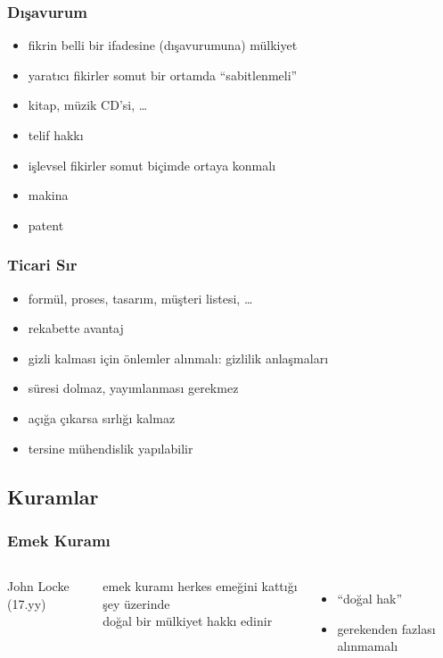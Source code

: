 \documentclass[dvipsnames]{beamer}
\theoremstyle{plain}
\begin{document}
\begin{frame}
  \frametitle{Dışavurum}

  \begin{itemize}
    \item fikrin belli bir \alert{ifade}sine (dışavurumuna) mülkiyet

    \medskip
    \item yaratıcı fikirler somut bir ortamda ``sabitlenmeli''
    \item kitap, müzik CD'si, \ldots
    \item \alert{telif hakkı}

    \pause
    \medskip
    \item işlevsel fikirler somut biçimde ortaya konmalı
    \item makina
    \item \alert{patent}
  \end{itemize}
\end{frame}

\begin{frame}
  \frametitle{Ticari Sır}

  \begin{itemize}
    \item formül, proses, tasarım, müşteri listesi, \ldots
    \item rekabette avantaj
    \item gizli kalması için önlemler alınmalı: gizlilik anlaşmaları

    \pause
    \medskip
    \item süresi dolmaz, yayımlanması gerekmez
    \item açığa çıkarsa sırlığı kalmaz

    \medskip
    \item \alert{tersine mühendislik} yapılabilir
  \end{itemize}
\end{frame}

\subsection{Kuramlar}

\begin{frame}
  \frametitle{Emek Kuramı}

  \begin{columns}
    \begin{center}

      John Locke (17.yy)
    \end{center}

    \begin{block}{emek kuramı}
        herkes emeğini kattığı şey üzerinde\\
        doğal bir mülkiyet hakkı edinir
    \end{block}
    \begin{itemize}
      \item ``doğal hak''
      \item gerekenden fazlası alınmamalı
    \end{itemize}
  \end{columns}
\end{frame}
\end{document}
